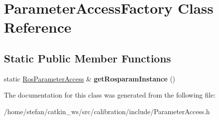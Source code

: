 \hypertarget{classParameterAccessFactory}{\section{\-Parameter\-Access\-Factory \-Class \-Reference}
\label{classParameterAccessFactory}
}
\subsection*{\-Static \-Public \-Member \-Functions}
\begin{DoxyCompactItemize}
\item 
\hypertarget{classParameterAccessFactory_a8b1ca357bc753557bcd2372f9c17eee4}{static \hyperlink{classRosParameterAccess}{\-Ros\-Parameter\-Access} \& {\bfseries get\-Rosparam\-Instance} ()}\label{classParameterAccessFactory_a8b1ca357bc753557bcd2372f9c17eee4}

\end{DoxyCompactItemize}


\-The documentation for this class was generated from the following file\-:\begin{DoxyCompactItemize}
\item 
/home/stefan/catkin\-\_\-ws/src/calibration/include/\-Parameter\-Access.\-h\end{DoxyCompactItemize}
